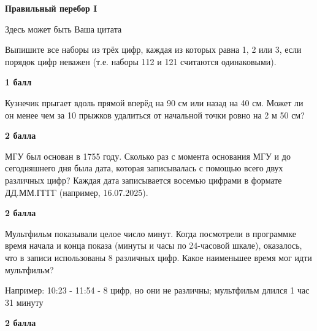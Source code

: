 \centerline{\bf \Huge Правильный перебор I}

\begin{flushright}
        \scriptsize{Здесь может быть Ваша цитата}
\end{flushright}

 Выпишите все наборы из трёх цифр, каждая из которых равна 1, 2 или 3, если порядок цифр неважен (т.е. наборы 112 и 121
считаются одинаковыми).

\begin{flushright} \textbf{1 балл}\\ 
\end{flushright}


 Кузнечик прыгает вдоль прямой вперёд на 90 см
или назад на 40 см. Может ли он менее чем за 10 прыжков удалиться от начальной точки ровно
на 2 м 50 см?

\begin{flushright} \textbf{2 балла}\\ 
\end{flushright}


 МГУ был основан в 1755 году. Сколько раз с момента основания МГУ и до сегодняшнего дня
была дата, которая записывалась с помощью всего двух различных цифр? Каждая дата записывается восемью
цифрами в формате ДД.ММ.ГГГГ (например, 16.07.2025).

\begin{flushright} \textbf{2 балла}\\ 
\end{flushright}


 Мультфильм показывали целое число минут. Когда посмотрели в программке время начала и конца показа (минуты и часы по 24-часовой шкале), оказалось, что в записи использованы 8 различных цифр. Какое наименьшее время мог идти мультфильм?

Например: 10:23 - 11:54 - 8 цифр, но они не различны; мультфильм длился 1 час 31 минуту

\begin{flushright} \textbf{2 балла}\\ 
\end{flushright}

